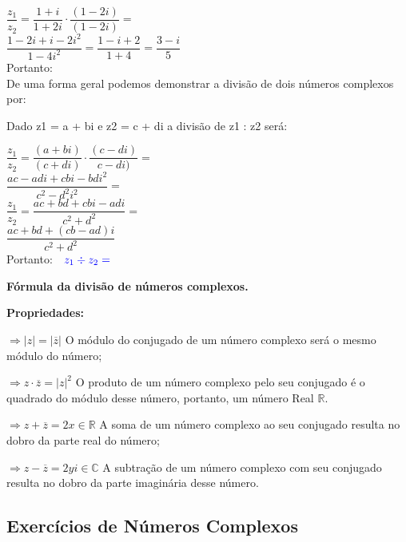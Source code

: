 \begin{multicols*}{2}
	 $ \dfrac{z_1}{z_2} = \dfrac{1 + i}{1 + 2i} \cdot \dfrac{(1 - 2i)}{(1 - 2i)} = $\\
	 
	 $ \dfrac{1 - 2i + i -2i^2}{1 - 4i^2} = \dfrac{1 - i + 2}{1 +4} = \dfrac{3 - i}{5} $\\
	 
	 Portanto: \\
	 
	 De uma forma geral podemos demonstrar a divisão de dois números complexos por:

	Dado z1 = a + bi e z2 = c + di a divisão de z1 : z2 será:
	
	$ \dfrac{z_1}{z_2} = \dfrac{(a + bi)}{(c + di)} \cdot \dfrac{(c - di)}{c - di)} = $ \\
	
	$ \dfrac{ac - adi + cbi - bdi^2}{c^2 - d^2i^2} = $\\
	
	$ \dfrac{z_1}{z_2}= \dfrac{ac + bd + cbi - adi}{c^2 + d^2}= $\\
	
	$ \dfrac{ac + bd + (cb - ad)i}{c^2 + d^2} $\\
	
	Portanto: $\color{blue} \ \ z_1 \div z_2= $\\
	
	
	\textbf{Fórmula da divisão de números complexos.}
	
	\textbf{Propriedades:}
	
	$\Rightarrow |z| = |\overline{z}| $ O módulo do conjugado de um número complexo será o mesmo módulo do número;
	
	$\Rightarrow z \cdot \overline{z} = |z|^2 $ O produto de um número complexo pelo seu conjugado é o quadrado do módulo desse número, portanto, um número Real $\mathbb{R}.$ 
	
	$\Rightarrow z + \overline{z} = 2 x \in \mathbb{R} $ A soma de um número complexo ao seu conjugado resulta no dobro da parte real do número;
	
	$\Rightarrow z - \overline{z} = 2yi \in \mathbb{C} $ A subtração de um número complexo com seu conjugado resulta no dobro da parte imaginária desse número.
	
	\subsection{Exercícios de Números Complexos}
	

\end{multicols*}
